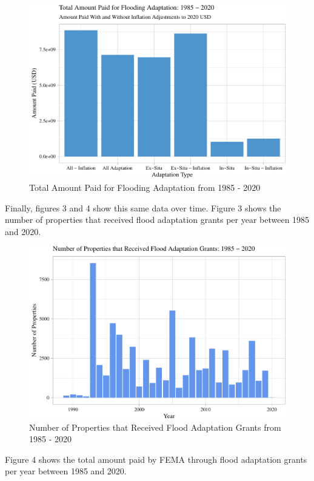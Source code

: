 \documentclass[
  12pt,
]{article}
\begin{document}
\begin{figure}
\centering
\includegraphics{finalreport_files/figure-latex/unnamed-chunk-9-1.pdf}
\caption{Total Amount Paid for Flooding Adaptation from 1985 - 2020}
\end{figure}

Finally, figures 3 and 4 show this same data over time. Figure 3 shows
the number of properties that received flood adaptation grants per year
between 1985 and 2020.

\begin{figure}
\centering
\includegraphics{finalreport_files/figure-latex/unnamed-chunk-10-1.pdf}
\caption{Number of Properties that Received Flood Adaptation Grants from
1985 - 2020}
\end{figure}

\newpage

Figure 4 shows the total amount paid by FEMA through flood adaptation
grants per year between 1985 and 2020. \newline
\end{document}
